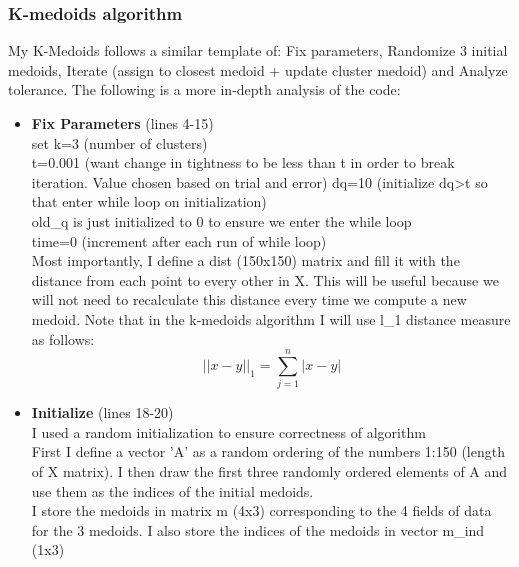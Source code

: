 \documentclass{article}
\begin{document}
\subsubsection*{K-medoids algorithm}
My K-Medoids follows a similar template of: Fix parameters, Randomize 3 initial medoids, Iterate (assign to closest medoid + update cluster medoid) and Analyze tolerance.  The following is a more in-depth analysis of the code:

\begin{itemize}
    \item \textbf{Fix Parameters} (lines 4-15) \\
    set k=3 (number of clusters) \\
    t=0.001 (want change in tightness to be less than t in order to break iteration.  Value chosen based on trial and error)
    dq=10 (initialize dq>t so that enter while loop on initialization) \\
    old\_q is just initialized to 0 to ensure we enter the while loop \\
    time=0 (increment after each run of while loop)\\
    Most importantly, I define a dist (150x150) matrix and fill it with the distance from each point to every other in X.  This will be useful because we will not need to recalculate this distance every time we compute a new medoid.  Note that in the k-medoids algorithm I will use l\_1 distance measure as follows: 
    \[||x-y||_1 = \sum_{j=1}^{n} |x-y|\] 
    
    \item \textbf{Initialize} (lines 18-20)\\
    I used a random initialization to ensure correctness of algorithm \\
    First I define a vector 'A' as a random ordering of the numbers 1:150 (length of X matrix). I then draw the first three randomly ordered elements of A and use them as the indices of the initial medoids.\\
    I store the medoids in matrix m (4x3) corresponding to the 4 fields of data for the 3 medoids.  I also store the indices of the medoids in vector m\_ind (1x3)
    

\end{itemize}
\end{document}

